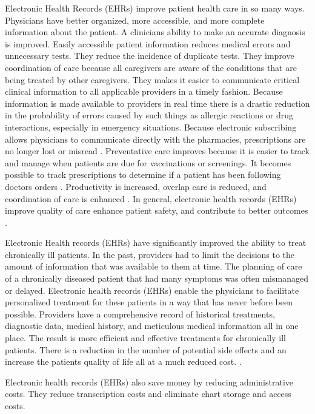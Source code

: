 \documentclass[sigconf]{acmart}
\begin{document}
Electronic Health Records (EHRs) improve patient health care in so many ways. Physicians have better organized, more accessible, and more complete information about the patient.  A clinicians ability to make an accurate diagnosis is improved.  Easily accessible patient information reduces medical errors and unnecessary tests. They reduce the incidence of duplicate tests. They improve coordination of care because all caregivers are aware of the conditions that are being treated by other caregivers. They makes it easier to communicate critical clinical information to all applicable providers in a timely fashion. Because information is made available to providers in real time there is a drastic reduction in the probability of errors caused by such things as allergic reactions or drug interactions, especially in emergency situations.  Because electronic subscribing allows physicians to communicate directly with the pharmacies, prescriptions are no longer lost or misread \cite{www-google-elec}.  Preventative care improves because it is easier to track and manage when patients are due for vaccinations or screenings. It becomes possible to track prescriptions to determine if a patient has been following doctors orders \cite{www-google-datapine}.  Productivity is increased, overlap care is reduced, and coordination of care is enhanced \cite {www-google-christian}. In general, electronic health records (EHRs) improve quality of care enhance patient safety, and contribute to better outcomes \cite{www-google-elec}.

Electronic Health records (EHRs) have significantly improved the ability to treat chronically ill patients.  In the past, providers had to limit the decisions to the amount of information that was available to them at time. The planning of care of a chronically diseased patient that had many symptoms was often mismanaged or delayed.  Electronic health records (EHRs) enable the physicians to facilitate personalized treatment for these patients in a way that has never before been possible. Providers have a comprehensive record of historical treatments, diagnostic data, medical history, and meticulous medical information all in one place. The result is more efficient and effective treatments for chronically ill patients. There is a reduction in the number of potential side effects and an increase the patients quality of life all at a much reduced cost. \cite{www-google-christian}.  

Electronic health records (EHRs) also save money by reducing administrative costs. They reduce transcription costs and eliminate chart storage and access costs.
\end{document}
